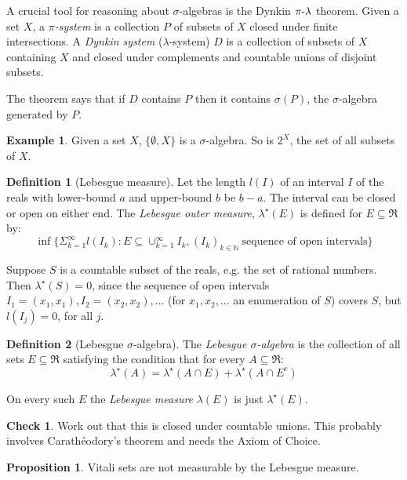 \documentclass{article}
\theoremstyle{definition}
\newtheorem{definition}{Definition}[section]
\newtheorem{proposition}[theorem]{Proposition}
\newtheorem*{example}{Example}
\newtheorem*{CHECK}{{\sc Check}}
\newcommand{\mymathhyphen}{{\hbox{-}}}
\begin{document}
A crucial tool for reasoning about \(\sigma\)-algebras is the Dynkin \(\pi\mymathhyphen{}\lambda\) theorem. Given a set \(X\), a {\em \(\pi\)-system} is a collection \(P\) of subsets of \(X\) closed under finite intersections. A {\em Dynkin system} (\(\lambda\)-system) \(D\) is a collection of subsets of \(X\) containing \(X\) and closed under complements and countable unions of disjoint subsets.

The theorem says that if \(D\) contains \(P\) then it contains \(\sigma(P)\), the \(\sigma\)-algebra generated by \(P\).

\begin{example}
  Given a set \(X\), \(\{\emptyset, X\}\) is a \(\sigma\)-algebra. So is \(2^X\), the set of all subsets of \(X\).
\end{example}

\begin{definition}[Lebesgue measure]
  Let the length \(l(I)\) of an interval \(I\) of the reals with lower-bound \(a\) and upper-bound \(b\) be \(b-a\). The interval can be closed or open on either end. The {\em Lebesgue outer measure}, \(\lambda^{\star}(E)\) is defined for \(E\subseteq \Re\) by:
  \[ \inf{} \{\Sigma_{k=1}^{\infty} l(I_k) : E \subseteq \cup_{k=1}^{\infty} I_k, (I_k)_{k \in \mathbb{N}}\ \mbox{sequence of open intervals}\}\]    
\end{definition}

Suppose \(S\) is a countable subset of the reals, e.g.{} the set of rational numbers. Then \(\lambda^{\star}(S)=0\), since the sequence of open intervals \(I_1=(x_1,x_1), I_2=(x_2,x_2), \ldots\) (for \(x_1,x_2,\ldots\) an enumeration of \(S\)) covers \(S\), but \(l(I_j)=0\), for all \(j\).

\begin{definition}[Lebesgue \(\sigma\)-algebra]
  The {\em Lebesgue \(\sigma\)-algebra} is the collection of all sets \(E \subseteq \Re\) satisfying the condition that for every \(A\subseteq \Re\):
  \[ \lambda^{\star}(A) = \lambda^{\star}(A\cap E) + \lambda^{\star}(A \cap E^c)\]    

  On every such \(E\) the {\em Lebesgue measure} \(\lambda(E)\) is just \(\lambda^{\star}(E)\).
\end{definition}
\begin{CHECK}
  Work out that this is closed under countable unions. This probably involves Carath\'{e}odory's theorem and needs the Axiom of Choice.
\end{CHECK}  

\begin{proposition}
Vitali sets are not measurable by the Lebesgue measure.   
\end{proposition}
\end{document}

